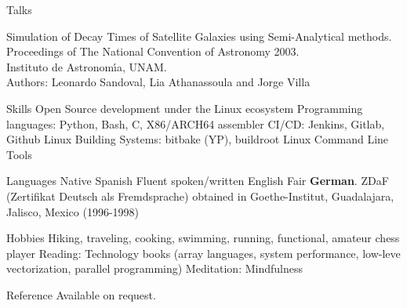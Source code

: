 \documentclass{resume}
\begin{document}

\begin{category}{Talks}

\citembullet Simulation of Decay Times of Satellite Galaxies using Semi-Analytical methods.\\
Proceedings of The National Convention of Astronomy 2003.\\
Instituto de Astronom\'{\i}a, UNAM. \\
Authors: Leonardo Sandoval, Lia Athanassoula and Jorge Villa
\end{category}

\begin{category}{Skills}
  \citembullet Open Source development under the Linux ecosystem
  \citembullet Programming languages: Python, Bash, C, X86/ARCH64 assembler
  \citembullet CI/CD: Jenkins, Gitlab, Github
  \citembullet Linux Building Systems: bitbake (YP), buildroot
  \citembullet Linux Command Line Tools
\end{category}

\begin{category}{Languages}
  \citembullet Native Spanish
  \citembullet Fluent spoken/written English
  \citembullet Fair \textbf{German}. ZDaF (Zertifikat Deutsch als Fremdsprache) obtained in Goethe-Institut, Guadalajara, Jalisco, Mexico (1996-1998)
\end{category}

\begin{category}{Hobbies}
  \citembullet Hiking, traveling, cooking, swimming, running, functional, amateur chess player
  \citembullet Reading: Technology books (array languages, system performance, low-leve vectorization, parallel programming)
  \citembullet Meditation: Mindfulness
\end{category}

\begin{category}{Reference} 
  \citemnobullet Available on request.
\end{category}
\end{document}
